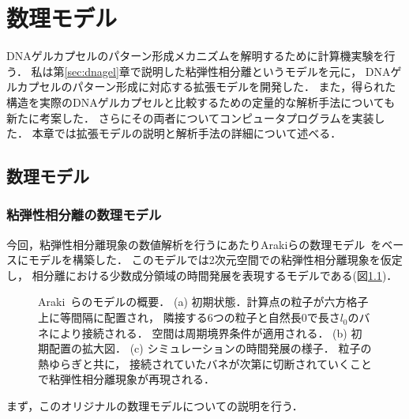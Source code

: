 \chapter{数理モデル}
\label{sec:model}

DNAゲルカプセルのパターン形成メカニズムを解明するために計算機実験を行う．
私は第\ref{sec:dnagel}章で説明した粘弾性相分離というモデルを元に，
DNAゲルカプセルのパターン形成に対応する拡張モデルを開発した．
また，得られた構造を実際のDNAゲルカプセルと比較するための定量的な解析手法についても新たに考案した．
さらにその両者についてコンピュータプログラムを実装した．
本章では拡張モデルの説明と解析手法の詳細について述べる．


\section{数理モデル}


\subsection{粘弾性相分離の数理モデル}
今回，粘弾性相分離現象の数値解析を行うにあたりArakiらの数理モデル~\cite{araki2005simple}をベースにモデルを構築した．
このモデルでは2次元空間での粘弾性相分離現象を仮定し，
相分離における少数成分領域の時間発展を表現するモデルである(図\ref{fig:model_2d})．
\begin{figure}
\centering

\caption{
    Araki~\cite{araki2005simple}らのモデルの概要．
    (a) 初期状態．計算点の粒子が六方格子上に等間隔に配置され，
        隣接する6つの粒子と自然長$0$で長さ$l_0$のバネにより接続される．
        空間は周期境界条件が適用される．
    (b) 初期配置の拡大図．
    (c) シミュレーションの時間発展の様子．
        粒子の熱ゆらぎと共に，
        接続されていたバネが次第に切断されていくことで粘弾性相分離現象が再現される．
}
\label{fig:model_2d}
\end{figure}
まず，このオリジナルの数理モデルについての説明を行う．

